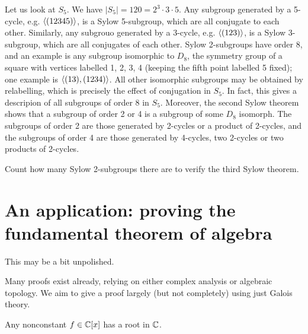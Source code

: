 \begin{example}
    Let us look at $S_5$. We have $|S_5| = 120 = 2^3 \cdot 3 \cdot 5$. Any subgroup generated by a 5-cycle, e.g. $\langle {(12345)} \rangle$, is a Sylow 5-subgroup, which are all conjugate to each other. Similarly, any subgrouo generated by a 3-cycle, e.g. $\langle {(123)} \rangle$, is a Sylow 3-subgroup, which are all conjugates of each other. Sylow 2-subgroups have order 8, and an example is any subgroup isomorphic to $D_8$, the symmetry group of a square with vertices labelled 1, 2, 3, 4 (keeping the fifth point labelled 5 fixed); one example is $\langle {(13), (1234)} \rangle$. All other isomorphic subgroups may be obtained by relabelling, which is precisely the effect of conjugation in $S_5$. In fact, this gives a descripion of all subgroups of order 8 in $S_5$. Moreover, the second Sylow theorem shows that a subgroup of order 2 or 4 is a subgroup of some $D_8$ isomorph. The subgroups of order 2 are those generated by 2-cycles or a product of 2-cycles, and the subgroups of order 4 are those generated by 4-cycles, two 2-cycles or two products of 2-cycles.
\end{example}

\begin{exercise}
    Count how many Sylow 2-subgroups there are to verify the third Sylow theorem.
\end{exercise}

\section{An application: proving the fundamental theorem of algebra}

\begin{block}
    This may be a bit unpolished.
\end{block}

Many proofs exist already, relying on either complex analysis or algebraic topology. We aim to give a proof largely (but not completely) using just Galois theory.

\begin{theorem}
    Any nonconstant $f \in \mathbb{{C}}[x]$ has a root in $\mathbb{{C}}$.
\end{theorem}

